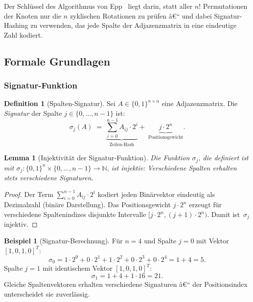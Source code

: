 ﻿\documentclass[12pt,a4paper,twoside]{article}
\theoremstyle{definition}
\newtheorem{definition}{Definition}[section]
\newtheorem{beispiel}{Beispiel}[section]
\theoremstyle{plain}
\newtheorem{lemma}[theorem]{Lemma}
\theoremstyle{remark}
\begin{document}
Der Schlüssel des Algorithmus von Epp~\cite{Epp2026} liegt darin,
statt aller $n!$ Permutationen der Knoten nur die $n$ zyklischen
Rotationen zu prüfen â€“ und dabei Signatur-Hashing zu verwenden,
das jede Spalte der Adjazenzmatrix in eine eindeutige Zahl
kodiert.

\subsection{Formale Grundlagen}
\label{sub:sa_grundlagen}

\subsubsection{Signatur-Funktion}

\begin{definition}[Spalten-Signatur]
Sei $A \in \{0,1\}^{n \times n}$ eine Adjazenzmatrix.
Die \emph{Signatur} der Spalte $j \in \{0,\ldots,n{-}1\}$
ist:
\[
  \sigma_j(A) \;=\;
  \underbrace{\sum_{i=0}^{n-1} A_{ij} \cdot 2^i}_{\text{Zeilen-Hash}}
  +\;
  \underbrace{j \cdot 2^n}_{\text{Positionsgewicht}}.
\]
\end{definition}

\begin{lemma}[Injektivität der Signatur-Funktion]
Die Funktion $\sigma_j$, die definiert ist mit $\sigma_j: \{0,1\}^n \times \{0,\ldots,n{-}1\} \to \mathbb{N}$, ist injektiv: Verschiedene Spalten erhalten stets verschiedene
Signaturen.
\end{lemma}

\begin{proof}
Der Term $\sum_{i=0}^{n-1} A_{ij} \cdot 2^i$ kodiert jeden
Binärvektor eindeutig als Dezimalzahl (binäre Darstellung).
Das Positionsgewicht $j \cdot 2^n$ erzeugt für verschiedene
Spaltenindizes disjunkte Intervalle $[j \cdot 2^n, (j{+}1) \cdot 2^n)$.
Damit ist~$\sigma_j$ injektiv.
\end{proof}

\begin{beispiel}[Signatur-Berechnung]
Für $n=4$ und Spalte $j=0$ mit Vektor $[1, 0, 1, 0]^T$:
\[
  \sigma_0 = 1 \cdot 2^0 + 0 \cdot 2^1 + 1 \cdot 2^2 + 0 \cdot 2^3
           + 0 \cdot 2^4 = 1 + 4 = 5.
\]
Spalte $j=1$ mit identischem Vektor $[1, 0, 1, 0]^T$:
\[
  \sigma_1 = 1 + 4 + 1 \cdot 16 = 21.
\]
Gleiche Spaltenvektoren erhalten verschiedene Signaturen â€“
der Positionsindex unterscheidet sie zuverlässig.
\end{beispiel}
\end{document}
